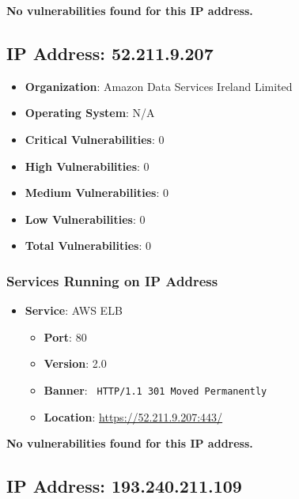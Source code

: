 \documentclass{article}
\begin{document}
\textbf{No vulnerabilities found for this IP address.}


\clearpage



\subsection*{IP Address: 52.211.9.207}

\begin{itemize}
    \item \textbf{Organization}: Amazon Data Services Ireland Limited
    \item \textbf{Operating System}:  N/A 
    \item \textbf{Critical Vulnerabilities}: 0
    \item \textbf{High Vulnerabilities}: 0
    \item \textbf{Medium Vulnerabilities}: 0
    \item \textbf{Low Vulnerabilities}: 0
    \item \textbf{Total Vulnerabilities}: 0
\end{itemize}

\subsubsection*{Services Running on IP Address}

\begin{itemize}
    
        \item \textbf{Service}: AWS ELB
        \begin{itemize}
            \item \textbf{Port}: 80
            \item \textbf{Version}:  2.0 
            \item \textbf{Banner}: \texttt{ HTTP/1.1 301 Moved Permanently
 }
            \item \textbf{Location}: \href{ https://52.211.9.207:443/ }{ https://52.211.9.207:443/ }
        \end{itemize}
    
\end{itemize}


\textbf{No vulnerabilities found for this IP address.}


\clearpage



\subsection*{IP Address: 193.240.211.109}
\end{document}
